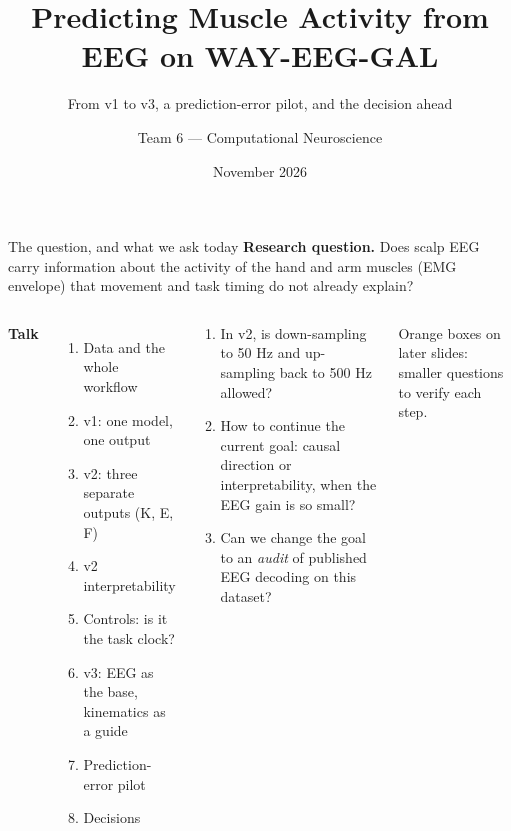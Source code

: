 \documentclass[aspectratio=169,10pt]{beamer}
\title{\textbf{Predicting Muscle Activity from EEG on WAY-EEG-GAL}}
\subtitle{From v1 to v3, a prediction-error pilot, and the decision ahead}
\author{Team 6 --- Computational Neuroscience}
\institute{Interdisciplinary School of Neuroscience}
\date{November 2026}
\begin{document}

\maketitle

\begin{frame}{The question, and what we ask today}
  \textbf{Research question.} Does scalp EEG carry information about the activity of the hand and arm muscles
  (EMG envelope) that movement and task timing do not already explain?

  \medskip
  \begin{columns}[T]
    \textbf{Talk}
    \begin{enumerate}\small
      \item Data and the whole workflow
      \item v1: one model, one output
      \item v2: three separate outputs (K, E, F)
      \item v2 interpretability
      \item Controls: is it the task clock?
      \item v3: EEG as the base, kinematics as a guide
      \item Prediction-error pilot
      \item Decisions
    \end{enumerate}
    \begin{tcolorbox}[askbox,title={Three main questions for the supervisor}]
      \begin{enumerate}\scriptsize
        \item In v2, is down-sampling to 50 Hz and up-sampling back to 500 Hz allowed?
        \item How to continue the current goal: causal direction or interpretability, when the EEG gain is so small?
        \item Can we change the goal to an \emph{audit} of published EEG decoding on this dataset?
      \end{enumerate}
    \end{tcolorbox}
    \vspace{1pt}
    {\scriptsize Orange boxes on later slides: smaller questions to verify each step.\par}
  \end{columns}
\end{frame}
\end{document}
